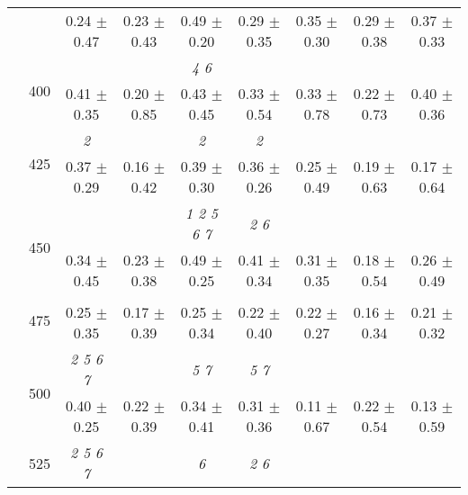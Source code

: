 \begin{table}[h]
{\begin{tabular}{
        ccccccccc}
 & & \cellcolor[HTML]{EFEFEF} 0.24 $\pm$ 0.47& \cellcolor[HTML]{EFEFEF} 0.23 $\pm$ 0.43& \cellcolor[HTML]{EFEFEF} 0.49 $\pm$ 0.20& \cellcolor[HTML]{EFEFEF} 0.29 $\pm$ 0.35& \cellcolor[HTML]{EFEFEF} 0.35 $\pm$ 0.30& \cellcolor[HTML]{EFEFEF} 0.29 $\pm$ 0.38& \cellcolor[HTML]{EFEFEF} 0.37 $\pm$ 0.33 \\ 
 & \multirow{2}{*}{400}& & & \textit{ 4 6 }& & & &  \\ 
 & & 0.41 $\pm$ 0.35& 0.20 $\pm$ 0.85& 0.43 $\pm$ 0.45& 0.33 $\pm$ 0.54& 0.33 $\pm$ 0.78& 0.22 $\pm$ 0.73& 0.40 $\pm$ 0.36 \\ 
 & \multirow{2}{*}{425}& \cellcolor[HTML]{EFEFEF} \textit{ 2 }& \cellcolor[HTML]{EFEFEF} & \cellcolor[HTML]{EFEFEF} \textit{ 2 }& \cellcolor[HTML]{EFEFEF} \textit{ 2 }& \cellcolor[HTML]{EFEFEF} & \cellcolor[HTML]{EFEFEF} & \cellcolor[HTML]{EFEFEF}  \\ 
 & & \cellcolor[HTML]{EFEFEF} 0.37 $\pm$ 0.29& \cellcolor[HTML]{EFEFEF} 0.16 $\pm$ 0.42& \cellcolor[HTML]{EFEFEF} 0.39 $\pm$ 0.30& \cellcolor[HTML]{EFEFEF} 0.36 $\pm$ 0.26& \cellcolor[HTML]{EFEFEF} 0.25 $\pm$ 0.49& \cellcolor[HTML]{EFEFEF} 0.19 $\pm$ 0.63& \cellcolor[HTML]{EFEFEF} 0.17 $\pm$ 0.64 \\ 
 & \multirow{2}{*}{450}& & & \textit{ 1 2 5 6 7 }& \textit{ 2 6 }& & &  \\ 
 & & 0.34 $\pm$ 0.45& 0.23 $\pm$ 0.38& 0.49 $\pm$ 0.25& 0.41 $\pm$ 0.34& 0.31 $\pm$ 0.35& 0.18 $\pm$ 0.54& 0.26 $\pm$ 0.49 \\ 
 & \multirow{2}{*}{475}& \cellcolor[HTML]{EFEFEF} & \cellcolor[HTML]{EFEFEF} & \cellcolor[HTML]{EFEFEF} & \cellcolor[HTML]{EFEFEF} & \cellcolor[HTML]{EFEFEF} & \cellcolor[HTML]{EFEFEF} & \cellcolor[HTML]{EFEFEF}  \\ 
 & & \cellcolor[HTML]{EFEFEF} 0.25 $\pm$ 0.35& \cellcolor[HTML]{EFEFEF} 0.17 $\pm$ 0.39& \cellcolor[HTML]{EFEFEF} 0.25 $\pm$ 0.34& \cellcolor[HTML]{EFEFEF} 0.22 $\pm$ 0.40& \cellcolor[HTML]{EFEFEF} 0.22 $\pm$ 0.27& \cellcolor[HTML]{EFEFEF} 0.16 $\pm$ 0.34& \cellcolor[HTML]{EFEFEF} 0.21 $\pm$ 0.32 \\ 
 & \multirow{2}{*}{500}& \textit{ 2 5 6 7 }& & \textit{ 5 7 }& \textit{ 5 7 }& & &  \\ 
 & & 0.40 $\pm$ 0.25& 0.22 $\pm$ 0.39& 0.34 $\pm$ 0.41& 0.31 $\pm$ 0.36& 0.11 $\pm$ 0.67& 0.22 $\pm$ 0.54& 0.13 $\pm$ 0.59 \\ 
 & \multirow{2}{*}{525}& \cellcolor[HTML]{EFEFEF} \textit{ 2 5 6 7 }& \cellcolor[HTML]{EFEFEF} & \cellcolor[HTML]{EFEFEF} \textit{ 6 }& \cellcolor[HTML]{EFEFEF} \textit{ 2 6 }& \cellcolor[HTML]{EFEFEF} & \cellcolor[HTML]{EFEFEF} & \cellcolor[HTML]{EFEFEF}  \\ 

\end{tabular}}
\end{table}
